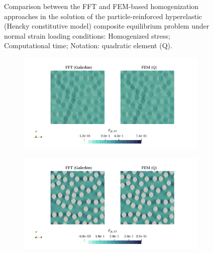 \begin{figure}[hbt]
\begin{subfigure}[b]{0.49\textwidth}
    \caption{}
    \label{subfig:hencky_2D_normal_stress_avg_cpu_time_vs_n_voxels}
  \end{subfigure}
  \caption{Comparison between the FFT and FEM-based homogenization approaches in the solution of the particle-reinforced hyperelastic (Hencky constitutive model) composite equilibrium problem under normal strain loading conditions:  Homogenized stress;  Computational time; Notation: quadratic element (Q).}
\label{fig:hencky_2D_normal_stiff_contrast}
\end{figure}

\begin{figure}[hbt]
  \centering
	\begin{subfigure}[b]{\textwidth}
    \centering
    \includegraphics[width=\textwidth]{figures/hencky_2D_ratio_-2_normal_strain_11}
    \caption{}
    \label{subfig:hencky_2D_ratio_4_normal_strain_11}
  \end{subfigure}
  \begin{subfigure}[b]{\textwidth}
    \centering
    \includegraphics[width=\textwidth]{figures/hencky_2D_ratio_4_normal_strain_11}

\end{subfigure}
\end{figure}
